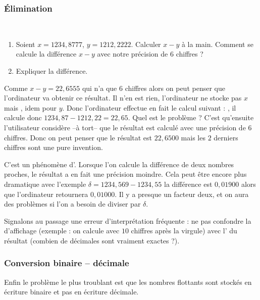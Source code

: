 \documentclass[class=report,crop=false]{standalone}
\begin{document}
\subsubsection{\'Elimination}


\begin{tp}~
\begin{enumerate}
  \item Soient $x = 1234,8777$, $y = 1212,2222$. Calculer $x-y$ à la main.
  Comment se calcule la différence $x-y$ avec notre précision
  de $6$ chiffres ?
  \item Expliquer la différence.
\end{enumerate}
\end{tp}

Comme $x-y = 22,6555$ qui n'a que $6$ chiffres alors on peut penser que l'ordinateur va obtenir ce résultat.
Il n'en est rien, l'ordinateur ne stocke pas $x$ mais , idem pour $y$.
Donc l'ordinateur effectue en fait le calcul suivant :
, il calcule donc $1234,87-1212,22=22,65$.
Quel est le problème ? C'est qu'ensuite l'utilisateur considère --à tort-- que le résultat est
calculé avec une précision de $6$ chiffres. Donc on peut penser que le résultat est $22,6500$
mais les $2$ derniers chiffres sont une pure invention.

C'est un phénomène d'. Lorsque l'on calcule la différence de deux nombres proches, le résultat
a en fait une précision moindre. Cela peut être encore plus dramatique avec l'exemple
$\delta = 1234,569-1234,55$ la différence est $0,01900$ alors que l'ordinateur retournera $0,01000$.
Il y a presque un facteur deux, et on aura des problèmes si l'on a besoin de diviser par $\delta$.

\medskip

Signalons au passage une erreur d'interprétation fréquente : ne pas confondre la  d'affichage
(exemple : on calcule avec $10$ chiffres après la virgule) avec l' du résultat
(combien de décimales sont vraiment exactes ?).


\subsubsection{Conversion binaire -- décimale}

Enfin le problème le plus troublant est que les nombres flottants
sont stockés en écriture binaire et pas en écriture décimale.
\end{document}

